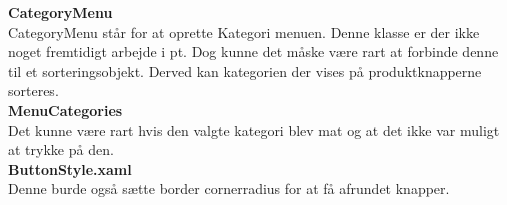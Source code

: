 \textbf{CategoryMenu}\\
CategoryMenu står for at oprette Kategori menuen. Denne klasse er der ikke noget fremtidigt arbejde i pt. Dog kunne det måske være rart at forbinde denne til et sorteringsobjekt. Derved kan kategorien der vises på produktknapperne sorteres.\\

\textbf{MenuCategories}\\
Det kunne være rart hvis den valgte kategori blev mat og at det ikke var muligt at trykke på den. \\

\textbf{ButtonStyle.xaml} \\
Denne burde også sætte border cornerradius for at få afrundet knapper.\\
